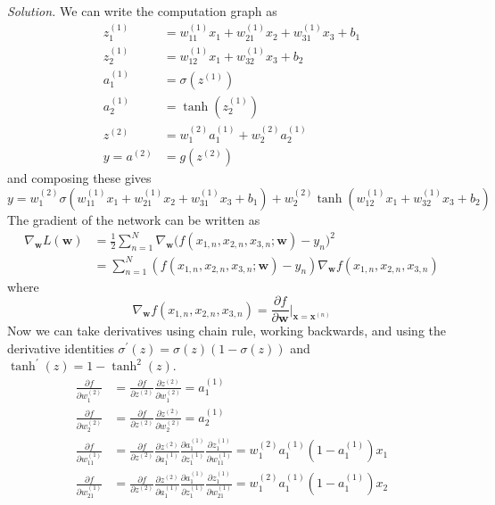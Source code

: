 \documentclass{article}
\theoremstyle{definition}
\theoremstyle{remark}
\theoremstyle{definition}
\newenvironment{solution}{\noindent \textit{Solution.}}{}
\begin{document}
\begin{solution}
We can write the computation graph as 
\begin{align*} 
    z_1^{(1)} & = w_{11}^{(1)} x_1 + w_{21}^{(1)} x_2 + w_{31}^{(1)} x_3 + b_1 \\
    z_2^{(1)} & = w_{12}^{(1)} x_1 + w_{32}^{(1)} x_3 + b_2 \\
    a_1^{(1)} & = \sigma(z^{(1)})\\
    a_2^{(1)} & = \tanh(z_2^{(1)}) \\
    z^{(2)} & = w_{1}^{(2)} a_1^{(1)} + w_2^{(2)} a_2^{(1)} \\
    y = a^{(2)} & = g(z^{(2)})
\end{align*}
and composing these gives 
\[y = w_1^{(2)} \sigma(w_{11}^{(1)} x_1  + w_{21}^{(1)} x_2 + w_{31}^{(1)} x_3 + b_1) + w_2^{(2)} \tanh(w_{12}^{(1)} x_1 + w_{32}^{(1)} x_3 + b_2) \]
The gradient of the network can be written as 
\begin{align*}
    \nabla_\mathbf{w} L(\mathbf{w}) & = \frac{1}{2} \sum_{n=1}^N \nabla_\mathbf{w} \big( f(x_{1, n}, x_{2, n}, x_{3, n}; \mathbf{w}) - y_n \big)^2 \\
    & = \sum_{n=1}^N (f(x_{1, n}, x_{2, n}, x_{3, n}; \mathbf{w}) - y_n) \nabla_\mathbf{w} f(x_{1, n}, x_{2, n}, x_{3, n})
\end{align*}
where 
\[\nabla_\mathbf{w} f(x_{1, n}, x_{2, n}, x_{3, n}) = \frac{\partial f}{\partial \mathbf{w}} \bigg|_{\mathbf{x} = \mathbf{x}^{(n)}}\] 
Now we can take derivatives using chain rule, working backwards, and using the derivative identities $\sigma^\prime (z)  = \sigma(z) (1 - \sigma(z))$ and $\tanh^\prime (z) = 1 - \tanh^2 (z)$. 
\begin{align*}
    \frac{\partial f}{\partial w_1^{(2)}} & = \frac{\partial f}{\partial z^{(2)}} \frac{\partial z^{(2)}}{\partial w_1^{(2)}} = a_1^{(1)} \\
    \frac{\partial f}{\partial w_2^{(2)}} & = \frac{\partial f}{\partial z^{(2)}} \frac{\partial z^{(2)}}{\partial w_2^{(2)}} = a_2^{(1)} \\ 
    \frac{\partial f}{\partial w_{11}^{(1)}} & = \frac{\partial f}{\partial z^{(2)}} \frac{\partial z^{(2)}}{\partial a^{(1)}_1} \frac{\partial a^{(1)}_1}{\partial z_1^{(1)}} \frac{\partial z_1^{(1)}}{\partial w_{11}^{(1)}} = w_1^{(2)} a_1^{(1)} (1 - a_1^{(1)}) x_1\\
    \frac{\partial f}{\partial w_{21}^{(1)}} & = \frac{\partial f}{\partial z^{(2)}} \frac{\partial z^{(2)}}{\partial a^{(1)}_1} \frac{\partial a^{(1)}_1}{\partial z_1^{(1)}} \frac{\partial z_1^{(1)}}{\partial w_{21}^{(1)}} = w_1^{(2)} a_1^{(1)} (1 - a_1^{(1)}) x_2\\

\end{align*}
\end{solution}
\end{document}
